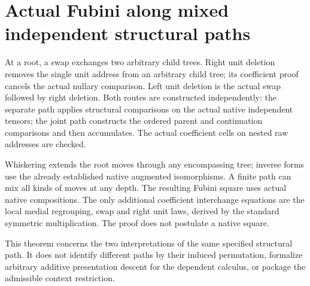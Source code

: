 \documentclass{article}
\begin{document}
\section*{Actual Fubini along mixed independent structural paths}
At a root, a swap exchanges two arbitrary child trees. Right
unit deletion removes the single unit address from an arbitrary
child tree; its coefficient proof cancels the actual nullary
comparison. Left unit deletion is the actual swap followed by
right deletion. Both routes are constructed independently:
the separate path applies structural comparisons on the actual
native independent tensors; the joint path constructs the
ordered parent and continuation comparisons and then accumulates.
The actual coefficient cells on nested raw addresses are checked.

Whiskering extends the root moves through any encompassing
tree; inverse forms use the already established native augmented
isomorphisms. A finite path can mix all kinds of moves at any
depth. The resulting Fubini square uses actual native compositions.
The only additional coefficient interchange equations are the
local medial regrouping, swap and right unit laws, derived by
the standard symmetric multiplication. The proof does not
postulate a native square.

This theorem concerns the two interpretations of the same
specified structural path. It does not identify different paths
by their induced permutation, formalize arbitrary additive
presentation descent for the dependent calculus, or package
the admissible context restriction.
\end{document}
